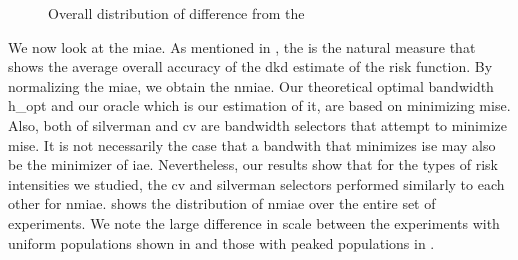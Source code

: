 \begin{figure}[htbp]
\begin{subfigure}[t]{0.45\textwidth}
        \label{fig:discussion:overall_nmise_diff_boxplot:peak}
    \end{subfigure}
    \caption{Overall distribution of  difference from the }
    \label{fig:discussion:overall_nmise_diff_boxplot}
\end{figure}

We now look at the \gls{miae}.
As mentioned in ,
the  is the natural measure that shows the average overall accuracy of the \gls{dkd} estimate of the \gls{risk} function.
By normalizing the \gls{miae}, we obtain the \gls{nmiae}.
Our theoretical optimal bandwidth \gls{h_opt} and our \gls{oracle} which is our estimation of it,
are based on minimizing \gls{mise}.
Also, both of \gls{silverman} and \gls{cv} are bandwidth selectors that attempt to minimize \gls{mise}.
It is not necessarily the case that a bandwith that minimizes \gls{ise} may also be the minimizer of \gls{iae}.
Nevertheless, our results show that for the types of \gls{risk} intensities we studied,
the \gls{cv} and \gls{silverman} selectors performed similarly to each other for \gls{nmiae}.
 shows the distribution of \gls{nmiae} over the entire set of experiments.
We note the large difference in scale between the experiments with uniform populations shown in  and those with peaked populations in .


